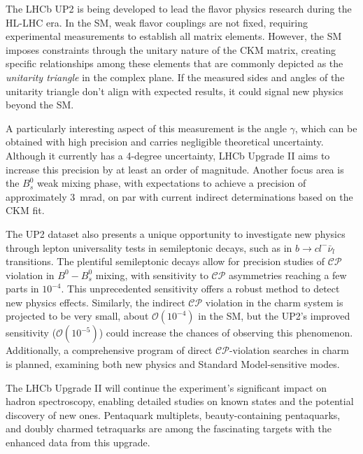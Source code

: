 The LHCb UP2 is being developed to lead the flavor physics research during the HL-LHC era\cite{lhcbcollaboration2019physics}. In the SM, weak flavor couplings are not fixed, requiring experimental measurements to establish all matrix elements. However, the SM imposes constraints through the unitary nature of the CKM matrix, creating specific relationships among these elements that are commonly depicted as the \textit{unitarity triangle} in the complex plane. If the measured sides and angles of the unitarity triangle don't align with expected results, it could signal new physics beyond the SM\cite{PhysRevLett.10.531, 10.1143/PTP.49.652}.

A particularly interesting aspect of this measurement is the angle $\gamma$, which can be obtained with high precision and carries negligible theoretical uncertainty. Although it currently has a 4-degree uncertainty\cite{LHCb:2021dcr}, LHCb Upgrade II aims to increase this precision by at least an order of magnitude. Another focus area is the $B_s^0$ weak mixing phase, with expectations to achieve a precision of approximately \SI{3}{\milli\radian}, on par with current indirect determinations based on the CKM fit.

The UP2 dataset also presents a unique opportunity to investigate new physics through lepton universality tests in semileptonic decays, such as in $b\rightarrow c l^-\bar{\nu}_l$ transitions. The plentiful semileptonic decays allow for precision studies of $\mathcal{CP}$ violation in $B^0-B^0_s$ mixing, with sensitivity to $\mathcal{CP}$ asymmetries reaching a few parts in $10^{−4}$. This unprecedented sensitivity offers a robust method to detect new physics effects. Similarly, the indirect $\mathcal{CP}$ violation in the charm system is projected to be very small, about $\mathcal{O}(10^{-4})$ in the SM, but the UP2's improved sensitivity ($\mathcal{O}(10^{−5})$) could increase the chances of observing this phenomenon. Additionally, a comprehensive program of direct $\mathcal{CP}$-violation searches in charm is planned, examining both new physics and Standard Model-sensitive modes.

The LHCb Upgrade II will continue the experiment's significant impact on hadron spectroscopy, enabling detailed studies on known states and the potential discovery of new ones. Pentaquark multiplets, beauty-containing pentaquarks, and doubly charmed tetraquarks are among the fascinating targets with the enhanced data from this upgrade.



